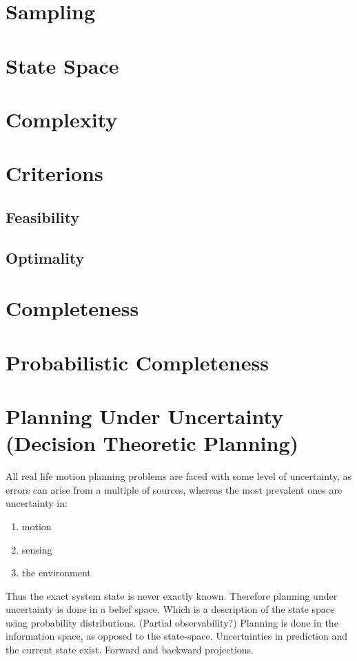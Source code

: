 \section{Sampling}

\section{State Space}

\section{Complexity}

\section{Criterions}

\subsection{Feasibility}
\subsection{Optimality}

\section{Completeness}

\section{Probabilistic Completeness}

\section{Planning Under Uncertainty (Decision Theoretic Planning)}

All real life motion planning problems are faced with some level of uncertainty,
as errors can arise from a multiple of sources, whereas the most prevalent ones
are uncertainty in:
\begin{enumerate}
\item motion
\item sensing
\item the environment
\end{enumerate}
Thus the exact system state is never exactly known. Therefore planning under
uncertainty is done in a belief space. Which is a description of the state space
using probability distributions. (Partial observability?)
Planning is done in the information space, as opposed to the state-space.
Uncertainties in prediction and the current state exist.
Forward and backward projections.

